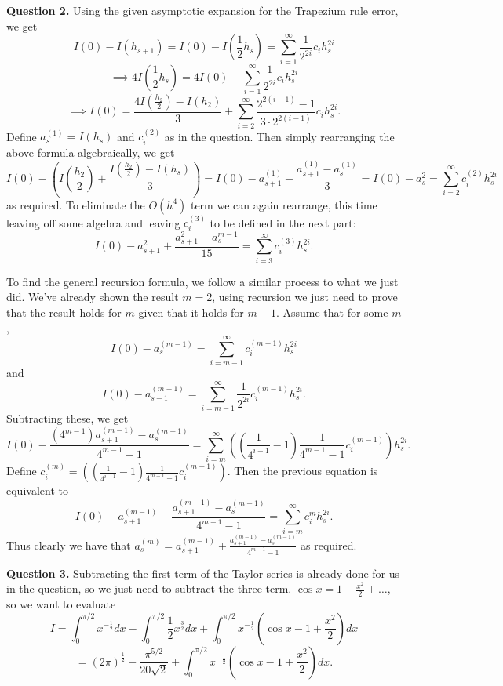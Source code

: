 \documentclass[letterpaper, reqno,11pt]{article}
\begin{document}
{\medskip\noindent\bf Question 2.} Using the given asymptotic expansion for the Trapezium rule error, we get
\[
I(0)-I(h_{s+1})=I(0)-I(\frac{1}{2}h_s)=\sum_{i=1}^{\infty}\frac{1}{2^{2i}}c_ih_s^{2i}
\]
\[
\implies 4I(\frac{1}{2}h_s)=4I(0)-\sum_{i=1}^{\infty}\frac{1}{2^{2i}}c_ih_s^{2i}
\]
\[
\implies I(0)=\frac{4I(\frac{h_2}{2})-I(h_2)}{3}+ \sum_{i=2}^{\infty}\frac{2^{2(i-1)}-1}{3\cdot 2^{2(i-1)}}c_i h_s^{2i}
.\]
Define $a_s^{(1)}=I(h_s)$ and $c_i^{(2)}$ as in the question. Then simply rearranging the above formula algebraically, we get
\[
I(0)-\left(I(\frac{h_2}{2})+\frac{I(\frac{h_2}{2})-I(h_s)}{3}\right)=I(0)-a_{s+1}^{(1)}-\frac{a_{s+1}^{(1)}-a_s^{(1)}}{3}=I(0)-a_{s}^{2}=\sum_{i=2}^{\infty}c_{i}^{(2)}h_s^{2i}
\]
as required. To eliminate the $O(h^{4})$ term we can again rearrange, this time leaving off some algebra and leaving $c_i^{(3)}$ to be defined in the next part:
\[
I(0)-a_{s+1}^{2}+ \frac{a_{s+1}^{2}-a_s^{m-1}}{15}=\sum_{i=3}^{\infty}c_i^{(3)}h_s^{2i}
.\]

To find the general recursion formula, we follow a similar process to what we just did. We've already shown the result $m=2$, using recursion we just need to prove that the result holds for $m$ given that it holds for $m-1$. Assume that for some $m$,
\[
    I(0)-a_{s}^{(m-1)}=\sum_{i=m-1}^{\infty}c_i^{(m-1)}h_s^{2i}
\]
and
\[
    I(0)-a_{s+1}^{(m-1)}=\sum_{i=m-1}^{\infty}\frac{1}{2^{2i}}c_i^{(m-1)}h_{s}^{2i}
.\]
Subtracting these, we get
\[
I(0)-\frac{(4^{m-1})a_{s+1}^{(m-1)}-a_s^{(m-1)}}{4^{m-1}-1}=\sum_{i=m}^{\infty}\left((\frac{1}{4^{i-1}}-1)\frac{1}{4^{m-1}-1}c_i^{(m-1)}\right)h_s^{2i}
.\]
Define $c_i^{(m)}=\left((\frac{1}{4^{i-1}}-1)\frac{1}{4^{m-1}-1}c_i^{(m-1)}\right)$. Then the previous equation is equivalent to
\[
I(0)-a_{s+1}^{(m-1)}-\frac{a_{s+1}^{(m-1)}-a_s^{(m-1)}}{4^{m-1}-1}=\sum_{i=m}^{\infty}c_{i}^{m}h_s^{2i}
.\]
Thus clearly we have that $a_s^{(m)}=a_{s+1}^{(m-1)}+\frac{a_{s+1}^{(m-1)}-a_s^{(m-1)}}{4^{m-1}-1}$ as required.


{\medskip\noindent\bf Question 3.} Subtracting the first term of the Taylor series is already done for us in the question, so we just need to subtract the three term. $\cos x=1-\frac{x^2}{2}+\ldots$, so we want to evaluate
\[
I=\int_0^{\pi/2}x^{-\frac{1}{2}}dx-\int_0^{\pi/2}\frac{1}{2}x^{\frac{3}{2}}dx+\int_0^{\pi/2}x^{-\frac{1}{2}}\left( \cos x-1+\frac{x^2}{2} \right) dx
\]
\[
=(2\pi)^{\frac{1}{2}}-\frac{\pi^{5 /2}}{20\sqrt{2}}+\int_0^{\pi/2}x^{-\frac{1}{2}}\left( \cos x-1+\frac{x^2}{2} \right) dx
.\]
\end{document}
